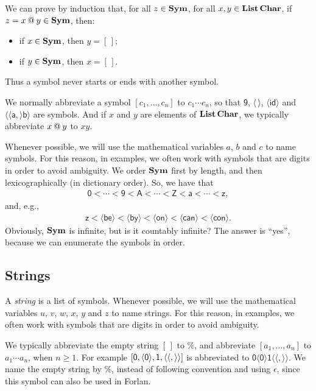 We can prove by induction that, for all $z\in\mathbf{Sym}$, for all
$x,y\in\mathbf{List}\,\mathbf{Char}$, if $z = x\mathbin{@} y\in\mathbf{Sym}$, then:
\begin{itemize}
\item if $x\in\mathbf{Sym}$, then $y=[\,]$;
\item if $y\in\mathbf{Sym}$, then $x=[\,]$.
\end{itemize}
Thus a symbol never starts or ends with another symbol.

We normally abbreviate a symbol $[c_1,\ldots,c_n]$ to $c_1\cdots c_n$,
so that $\mathsf{9}$, $\langle\,\rangle$, $\langle\mathsf{id}\rangle$
and $\mathsf{\langle\langle a,\rangle b\rangle}$ are symbols.  And if
$x$ and $y$ are elements of $\mathbf{List}\,\mathbf{Char}$, we
typically abbreviate $x\mathbin{@} y$ to
$xy$.

Whenever possible, we will use the mathematical variables $a$, $b$ and
$c$ to name symbols.
%
%
For this reason, in examples, we often work with symbols that are
digits in order to avoid ambiguity.
We order $\mathbf{Sym}$ first by length, and then lexicographically (in
dictionary order).  So, we have that
\begin{gather*}
\mathsf{0} < \cdots < \mathsf{9} < \mathsf{A} < \cdots < \mathsf{Z}
< \mathsf{a} < \cdots < \mathsf{z} ,
\end{gather*}
and, e.g.,
\begin{gather*}
\mathsf{z} < \mathsf{\langle be\rangle} < \mathsf{\langle by\rangle} <
\mathsf{\langle on\rangle} < \mathsf{\langle can\rangle} <
\mathsf{\langle con\rangle} .
\end{gather*}
%
Obviously, $\mathbf{Sym}$ is infinite, but is it countably infinite?
%
The answer is ``yes'', because we can enumerate the symbols in order.
%

\subsection{Strings}

%
A \emph{string}
%
is a list of symbols.
Whenever possible, we will use the mathematical variables $u$,
%
%
$v$, $w$, $x$, $y$ and $z$ to name strings.
For this reason, in examples, we often work with symbols that are
digits in order to avoid ambiguity.

We typically abbreviate the empty string $[\,]$ to $\%$, and
%
%
%
abbreviate $[a_1,\ldots,a_n]$ to $a_1\cdots a_n$, when $n\geq 1$.
For example
$[\mathsf{0},\langle\mathsf{0}\rangle,\mathsf{1},
\langle\langle,\rangle\rangle]$ is abbreviated to $\mathsf{0\langle
  0\rangle1\langle\langle,\rangle\rangle}$.
We name the empty string by $\%$, instead of following convention and
using $\epsilon$, since this symbol can also be used in Forlan.


